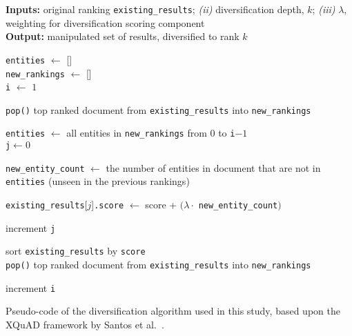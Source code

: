 \begin{algorithm}[t!]
    \textbf{Inputs:} original ranking \texttt{existing\_results}; \emph{(ii)} diversification depth, $k$; \emph{(iii)} $\lambda$, weighting for diversification scoring component\\
    \textbf{Output:} manipulated set of results, diversified to rank $k$
    \BlankLine
    
    \texttt{entities} $\longleftarrow$ []\\
    \texttt{new\_rankings} $\longleftarrow$ []\\
    \texttt{i} $\longleftarrow$ $1$\\
    
    \BlankLine
    
    \texttt{pop()} top ranked document from \texttt{existing\_results} into \texttt{new\_rankings}\\
    
    \BlankLine
    
     {
        \texttt{entities} $\longleftarrow$ all entities in \texttt{new\_rankings} from $0$ to \texttt{i}$-1$\\
        \texttt{j}$\longleftarrow 0$\\
        
        \BlankLine
        
         {
            \texttt{new\_entity\_count} $\longleftarrow$ the number of entities in document that are not in \texttt{entities} (unseen in the previous rankings)
            
            \BlankLine
            
            \texttt{existing\_results}[$j$]\texttt{.score} $\longleftarrow$ score + $(\lambda \cdot$ \texttt{new\_entity\_count}$)$
            
            \BlankLine
            
            increment \texttt{j}\\
        }
        
        \BlankLine
        
        sort \texttt{existing\_results} by \texttt{score}\\
        \texttt{pop()} top ranked document from \texttt{existing\_results} into \texttt{new\_rankings}\\
        
        \BlankLine
        
        increment \texttt{i}\\
    }
    
    \BlankLine
    
    \vspace*{4mm}
    \caption{Pseudo-code of the diversification algorithm used in this study, based upon the XQuAD framework by Santos et al.~\cite{santos2010query_reformulations_diversification}.}
    \label{alg:diversifying}
\end{algorithm}


